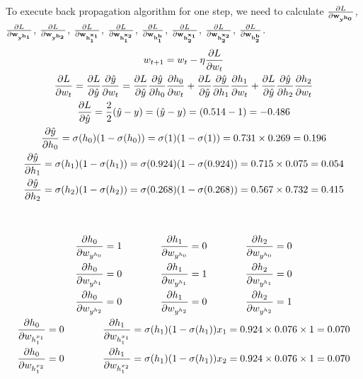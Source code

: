 \documentclass[12pt]{article}
\makeatletter
\newcommand*{\rom}[1]{\expandafter\@slowromancap\romannumeral #1@}
\makeatother
\begin{document}
\begin{qsolve}[Part \rom{2}]
    To execute back propagation algorithm for one step, we need to calculate $\pdv{L}{\mathbf{w_{y^{h_0}}}}$, $\pdv{L}{\mathbf{w_{y^{h_1}}}}$, $\pdv{L}{\mathbf{w_{y^{h_2}}}}$, $\pdv{L}{\mathbf{w_{h_1^{x_1}}}}$, $\pdv{L}{\mathbf{w_{h_1^{x_2}}}}$, $\pdv{L}{\mathbf{w_{h_1^{b}}}}$, $\pdv{L}{\mathbf{w_{h_2^{x_1}}}}$, $\pdv{L}{\mathbf{w_{h_2^{x_2}}}}$, $\pdv{L}{\mathbf{w_{h_2^{b}}}}$.
    \begin{gather*}
        w_{t+1} = w_t - \eta \pdv{L}{w_t}\\
        \pdv{L}{w_t} = \pdv{L}{\hat{y}} \pdv{\hat{y}}{w_t} = \pdv{L}{\hat{y}} \pdv{\hat{y}}{h_0} \pdv{h_0}{w_t} + \pdv{L}{\hat{y}} \pdv{\hat{y}}{h_1} \pdv{h_1}{w_t} + \pdv{L}{\hat{y}} \pdv{\hat{y}}{h_2} \pdv{h_2}{w_t} \\
        \pdv{L}{\hat{y}} = \frac{2}{2}(\hat{y} - y) = (\hat{y} - y) = (0.514 - 1) = -0.486 \\
        \pdv{\hat{y}}{h_0} = \sigma(h_0) (1 - \sigma(h_0)) = \sigma(1) (1 - \sigma(1)) = 0.731 \times 0.269 = 0.196 \\
        \pdv{\hat{y}}{h_1} = \sigma(h_1) (1 - \sigma(h_1)) = \sigma(0.924) (1 - \sigma(0.924)) = 0.715 \times 0.075 = 0.054 \\
        \pdv{\hat{y}}{h_2} = \sigma(h_2) (1 - \sigma(h_2)) = \sigma(0.268) (1 - \sigma(0.268)) = 0.567 \times 0.732 = 0.415 \\ \\ \\
        \pdv{h_0}{w_{y^{h_0}}} = 1 \; \; \; \; \; \; \; \; \; \; \; \; \; \; \pdv{h_1}{w_{y^{h_0}}} = 0 \; \; \; \; \; \; \; \; \; \; \; \; \; \; \pdv{h_2}{w_{y^{h_0}}} = 0 \\
        \pdv{h_0}{w_{y^{h_1}}} = 0 \; \; \; \; \; \; \; \; \; \; \; \; \; \; \pdv{h_1}{w_{y^{h_1}}} = 1 \; \; \; \; \; \; \; \; \; \; \; \; \; \; \pdv{h_2}{w_{y^{h_1}}} = 0 \\
        \pdv{h_0}{w_{y^{h_2}}} = 0 \; \; \; \; \; \; \; \; \; \; \; \; \; \; \pdv{h_1}{w_{y^{h_2}}} = 0 \; \; \; \; \; \; \; \; \; \; \; \; \; \; \pdv{h_2}{w_{y^{h_2}}} = 1 \\
        \pdv{h_0}{w_{h_1^{x_1}}} = 0 \; \; \; \; \; \; \; \; \; \; \; \; \; \; \pdv{h_1}{w_{h_1^{x_1}}} = \sigma(h_1) (1 - \sigma(h_1)) x_1 = 0.924 \times 0.076 \times 1 = 0.070 \\
        \pdv{h_0}{w_{h_1^{x_2}}} = 0 \; \; \; \; \; \; \; \; \; \; \; \; \; \; \pdv{h_1}{w_{h_1^{x_2}}} = \sigma(h_1) (1 - \sigma(h_1)) x_2 = 0.924 \times 0.076 \times 1 = 0.070 \\

\end{gather*}
\end{qsolve}
\end{document}
